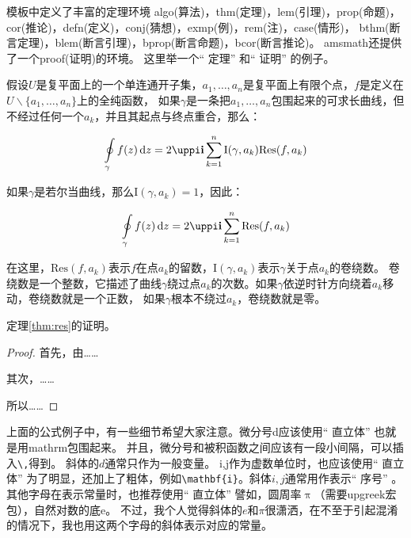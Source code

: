 \documentclass[doctor,openright,twoside]{sjtuthesis}
\theoremstyle{plain}
\theoremstyle{definition}
\theoremstyle{remark}
\theoremstyle{ocrenumbox}
\theoremstyle{plain}
\begin{document}
模板中定义了丰富的定理环境
algo(算法)，thm(定理)，lem(引理)，prop(命题)，cor(推论)，defn(定义)，conj(猜想)，exmp(例)，rem(注)，case(情形)，
bthm(断言定理)，blem(断言引理)，bprop(断言命题)，bcor(断言推论)。
amsmath还提供了一个proof(证明)的环境。
这里举一个`` 定理'' 和`` 证明'' 的例子。

\begin{thm}[留数定理]
\label{thm:res}
  假设$U$是复平面上的一个单连通开子集，$a_1,\ldots,a_n$是复平面上有限个点，$f$是定义在$U\backslash \{a_1,\ldots,a_n\}$上的全纯函数，
  如果$\gamma$是一条把$a_1,\ldots,a_n$包围起来的可求长曲线，但不经过任何一个$a_k$，并且其起点与终点重合，那么：

  \begin{equation}
    \label{eq:res}
    \ointop_{\gamma}f(z)\,\mathrm{d}z = 2\uppi\mathbf{i}\sum^n_{k=1}\mathrm{I}(\gamma,a_k)\mathrm{Res}(f,a_k)
  \end{equation}

  如果$\gamma$是若尔当曲线，那么$\mathrm{I}(\gamma, a_k)=1$，因此：

  \begin{equation}
    \label{eq:resthm}
    \ointop_{\gamma}f(z)\,\mathrm{d}z = 2\uppi\mathbf{i}\sum^n_{k=1}\mathrm{Res}(f,a_k)
  \end{equation}


  在这里，$\mathrm{Res}(f, a_k)$表示$f$在点$a_k$的留数，$\mathrm{I}(\gamma,a_k)$表示$\gamma$关于点$a_k$的卷绕数。
  卷绕数是一个整数，它描述了曲线$\gamma$绕过点$a_k$的次数。如果$\gamma$依逆时针方向绕着$a_k$移动，卷绕数就是一个正数，
  如果$\gamma$根本不绕过$a_k$，卷绕数就是零。

  定理\ref{thm:res}的证明。

  \begin{proof}
    首先，由……

    其次，……

    所以……
  \end{proof}
\end{thm}

上面的公式例子中，有一些细节希望大家注意。微分号d应该使用`` 直立体'' 也就是用mathrm包围起来。
并且，微分号和被积函数之间应该有一段小间隔，可以插入\verb+\,+得到。
斜体的\(d\)通常只作为一般变量。
i,j作为虚数单位时，也应该使用`` 直立体'' 为了明显，还加上了粗体，例如\verb+\mathbf{i}+。斜体\(i,j\)通常用作表示`` 序号'' 。
其他字母在表示常量时，也推荐使用`` 直立体'' 譬如，圆周率\(\uppi\)（需要upgreek宏包），自然对数的底\(\mathrm{e}\)。
不过，我个人觉得斜体的\(e\)和\(\pi\)很潇洒，在不至于引起混淆的情况下，我也用这两个字母的斜体表示对应的常量。
\end{document}
